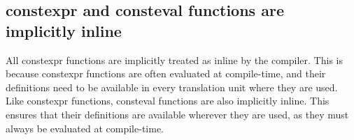 \documentclass{report}
\begin{document}
\bigbreak \noindent 
\subsection{constexpr and consteval functions are implicitly inline}
\bigbreak \noindent 
All constexpr functions are implicitly treated as inline by the compiler. This is because constexpr functions are often evaluated at compile-time, and their definitions need to be available in every translation unit where they are used.
\bigbreak \noindent 
Like constexpr functions, consteval functions are also implicitly inline.
\bigbreak \noindent 
This ensures that their definitions are available wherever they are used, as they must always be evaluated at compile-time.
\end{document}
